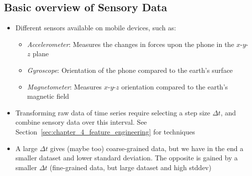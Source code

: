 \subsection{Basic overview of Sensory Data}
\begin{itemize}
	\item Different sensors available on mobile devices, such as:
	\begin{itemize}
		\item \textit{Accelerometer}: Measures the changes in forces upon the phone in the $x$-$y$-$z$ plane
		\item \textit{Gyroscope}: Orientation of the phone compared to
		the earth's surface
		\item \textit{Magnetometer}: Measures $x$-$y$-$z$ orientation compared to the earth's magnetic field
	\end{itemize}
	\item Transforming raw data of time series require selecting a step size $\Delta t$, and combine sensory data over this interval. See Section~\ref{sec:chapter_4_feature_engineering} for techniques
	\item A large $\Delta t$ gives (maybe too) coarse-grained data, but we have in the end a smaller dataset and lower standard deviation. The opposite is gained by a smaller $\Delta t$ (fine-grained data, but large dataset and high stddev)
\end{itemize}